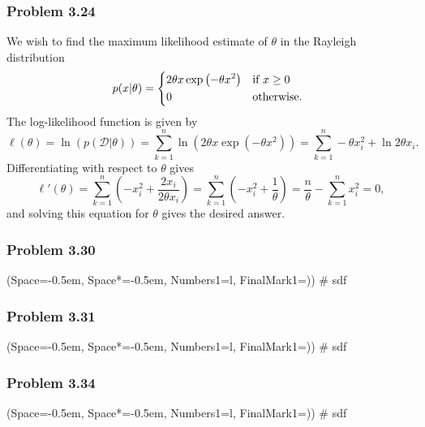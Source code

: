 \documentclass[12pt, a4paper]{article}
\newcommand{\listSpace}{-0.5em}%
\newcommand{\D}{\mathcal{D}}
\begin{document}
\subsubsection*{Problem 3.24}
We wish to find the maximum likelihood estimate of $\theta$ in the Rayleigh distribution
\begin{equation*}
	p (x | \theta) = 
	\begin{dcases*}
	2 \theta x \exp \left( -\theta x^2 \right) & if $x \geq 0$ \\
	0 & otherwise.
	\end{dcases*}
\end{equation*}
The log-likelihood function is given by
\begin{equation*}
	\ell(\theta)= \ln \left( p (\D | \theta) \right) 
	= 
	\sum_{k=1}^{n} \ln \left( 2 \theta x \exp \left( -\theta x^2 \right) \right)
	= 
	\sum_{k=1}^{n} - \theta x_i^2 + \ln 2 \theta x_i.
\end{equation*}
Differentiating with respect to $\theta$ gives
\begin{equation*}
	\ell'(\theta) =
	\sum_{k=1}^{n} \left(-  x_i^2 + \frac{2 x_i}{2 \theta x_i}\right)
	=
	\sum_{k=1}^{n} \left(-  x_i^2 + \frac{1}{\theta}\right)
	=
	\frac{n}{\theta} - \sum_{k=1}^{n}  x_i^2 
	= 0,
\end{equation*}
and solving this equation for $\theta$ gives the desired answer.

\subsubsection*{Problem 3.30}
\begin{easylist}[enumerate]
	\ListProperties(Space=\listSpace, Space*=\listSpace, Numbers1=l, FinalMark1={)})
	# sdf
\end{easylist}

\subsubsection*{Problem 3.31}
\begin{easylist}[enumerate]
	\ListProperties(Space=\listSpace, Space*=\listSpace, Numbers1=l, FinalMark1={)})
	# sdf
\end{easylist}

\subsubsection*{Problem 3.34}
\begin{easylist}[enumerate]
	\ListProperties(Space=\listSpace, Space*=\listSpace, Numbers1=l, FinalMark1={)})
	# sdf
\end{easylist}
\end{document}
